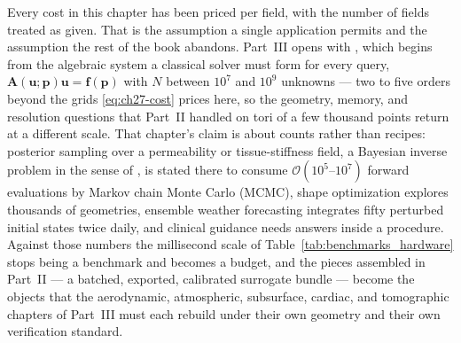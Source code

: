 Every cost in this chapter has been priced per field, with the number of fields
treated as given. That is the assumption a single application permits and the
assumption the rest of the book abandons. Part~III opens with
, which begins from
the algebraic system a classical solver must form for every query,
$\mathbf{A}(\mathbf{u};\mathbf{p})\mathbf{u} = \mathbf{f}(\mathbf{p})$ with $N$
between $10^{7}$ and $10^{9}$ unknowns --- two to five orders beyond the grids
\eqref{eq:ch27-cost} prices here, so the geometry, memory, and resolution
questions that Part~II handled on tori of a few thousand points return at a
different scale. That chapter's claim is about counts rather than recipes:
posterior sampling over a permeability or tissue-stiffness field, a Bayesian
inverse problem in the sense of \cite{stuart2010inverse}, is stated there to
consume $\mathcal{O}(10^{5}\text{--}10^{7})$ forward evaluations by Markov chain
Monte Carlo (MCMC), shape optimization explores thousands of geometries, ensemble
weather forecasting integrates fifty perturbed initial states twice daily, and
clinical guidance needs answers inside a procedure.
Against those numbers the millisecond scale of
Table~\ref{tab:benchmarks_hardware} stops being a benchmark and becomes a budget,
and the pieces assembled in Part~II --- a batched, exported, calibrated surrogate
bundle --- become the objects that the aerodynamic, atmospheric, subsurface,
cardiac, and tomographic chapters of Part~III must each rebuild under their own
geometry and their own verification standard.

\vspace{1.5em}
